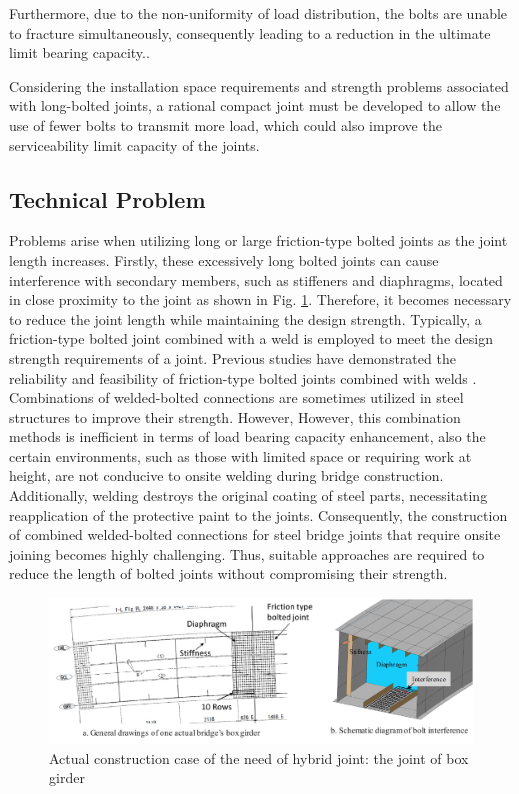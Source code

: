 Furthermore, due to the non-uniformity of load distribution, the bolts are unable to fracture simultaneously, consequently leading to a reduction in the ultimate limit bearing capacity.\cite{Takai2021BoltUnbuttoning,Peng2013FeaDimensions,peng2010}.

Considering the installation space requirements and strength problems associated with long-bolted joints, a rational compact joint must be developed to allow the use of fewer bolts to transmit more load, which could also improve the serviceability limit capacity of the joints.

\subsection{Technical Problem}
Problems arise when utilizing long or large friction-type bolted joints as the joint length increases. Firstly, these excessively \ac{long bolted joints} can cause interference with secondary members, such as stiffeners and diaphragms, located in close proximity to the joint as shown in Fig. \ref{fig-boxhsbinter}. Therefore, it becomes necessary to reduce the joint length while maintaining the design strength. Typically, a friction-type bolted joint combined with a weld is employed to meet the design strength requirements of a joint. Previous studies have demonstrated the reliability and feasibility of friction-type bolted joints combined with welds \cite{solodov2021,Thomas2000,Chang2019361,KHANDEL2022107036}. Combinations of welded-bolted connections are sometimes utilized in steel structures to improve their strength. However, However, this combination methods is inefficient in terms of load bearing capacity enhancement, also the certain environments, such as those with limited space or requiring work at height, are not conducive to onsite welding during bridge construction. Additionally, welding destroys the original coating of steel parts, necessitating reapplication of the protective paint to the joints. Consequently, the construction of combined welded-bolted connections for steel bridge joints that require onsite joining becomes highly challenging. Thus, suitable approaches are required to reduce the length of bolted joints without compromising their strength.

\begin{figure}[htbp]
    \centering
    \includegraphics[width=1\linewidth]{imgs//ch2/boxhsbinter.pdf}
    \caption{Actual construction case of the need of hybrid joint: the joint of box girder}
    \label{fig-boxhsbinter}
\end{figure}

